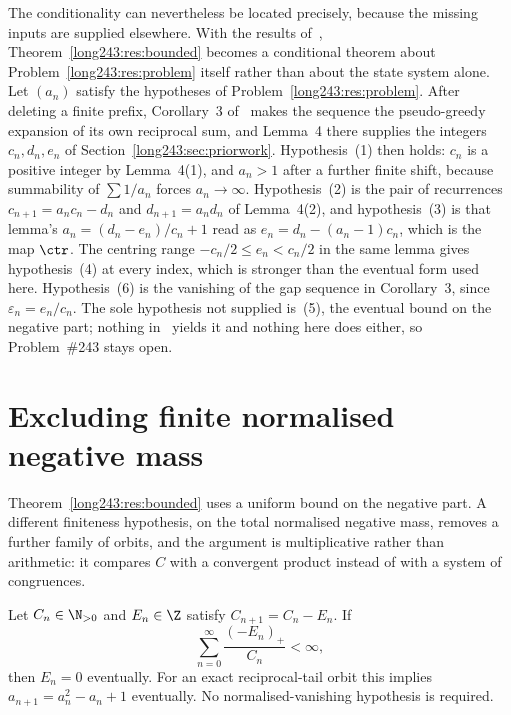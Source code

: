 The conditionality can nevertheless be located precisely, because the missing
inputs are supplied elsewhere.  With the results of~\cite{koizumi2025},
Theorem~\ref{long243:res:bounded} becomes a conditional theorem about
Problem~\ref{long243:res:problem} itself rather than about the state system alone.  Let
$(a_n)$ satisfy the hypotheses of Problem~\ref{long243:res:problem}.  After deleting a
finite prefix, Corollary~3 of~\cite[p.~9]{koizumi2025} makes the sequence the
pseudo-greedy expansion of its own reciprocal sum, and Lemma~4 there supplies
the integers $c_n,d_n,e_n$ of Section~\ref{long243:sec:priorwork}.  Hypothesis~(1) then
holds: $c_n$ is a positive integer by Lemma~4(1), and $a_n>1$ after a further
finite shift, because summability of $\sum1/a_n$ forces $a_n\to\infty$.
Hypothesis~(2) is the pair of recurrences $c_{n+1}=a_nc_n-d_n$ and
$d_{n+1}=a_nd_n$ of Lemma~4(2), and hypothesis~(3) is that lemma's
$a_n=(d_n-e_n)/c_n+1$ read as $e_n=d_n-(a_n-1)c_n$, which is the map $\ctr$.
The centring range $-c_n/2\le e_n<c_n/2$ in the same lemma gives
hypothesis~(4) at every index, which is stronger than the eventual form used
here.  Hypothesis~(6) is the vanishing
of the gap sequence in Corollary~3, since $\varepsilon_n=e_n/c_n$.  The sole
hypothesis not supplied is~(5), the eventual bound on the negative part;
nothing in~\cite{koizumi2025} yields it and nothing here does either, so
Problem~\#243 stays open.

\section{Excluding finite normalised negative mass}\label{long243:sec:mass}

Theorem~\ref{long243:res:bounded} uses a uniform bound on the negative part.  A
different finiteness hypothesis, on the total normalised negative mass, removes
a further family of orbits, and the argument is multiplicative rather than
arithmetic: it compares $C$ with a convergent product instead of with a system
of congruences.

\begin{theorem}\label{long243:res:mass}
Let \(C_n\in\N_{>0}\) and \(E_n\in\Z\) satisfy \(C_{n+1}=C_n-E_n\).
If
\[
 \sum_{n=0}^{\infty}\frac{(-E_n)_+}{C_n}<\infty,
\]
then \(E_n=0\) eventually. For an exact reciprocal-tail orbit this implies
\(a_{n+1}=a_n^2-a_n+1\) eventually. No normalised-vanishing hypothesis is required.
\end{theorem}

